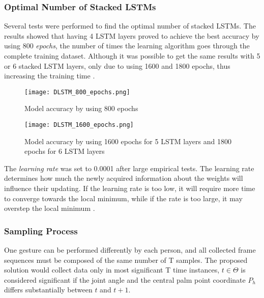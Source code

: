 \subsubsection{Optimal Number of Stacked LSTMs}
\label{sec:dlstm_params}

Several tests were performed to find the optimal number of stacked LSTMs. The results showed that having 4 LSTM layers proved to achieve the best accuracy by using 800 \textit{epochs}, the number of times the learning algorithm goes through the complete training dataset. Although it was possible to get the same results with 5 or 6 stacked LSTM layers, only due to using 1600 and 1800 epochs, thus increasing the training time \cite{avola}. 

\begin{figure}[ht]
    \centering
    \texttt{[image: DLSTM\_800\_epochs.png]}
    \caption{Model accuracy by using 800 epochs \cite{avola}}
    \label{fig:DLSTM_800_epochs}
\end{figure}

\begin{figure}[ht]
    \centering
    \texttt{[image: DLSTM\_1600\_epochs.png]}
    \caption{Model accuracy by using 1600 epochs for 5 LSTM layers and 1800 epochs for 6 LSTM layers \cite{avola}}
    \label{fig:DLSTM_1600_epochs}
\end{figure}

The \textit{learning rate} was set to 0.0001 after large empirical tests. The learning rate determines how much the newly acquired information about the weights will influence their updating. If the learning rate is too low, it will require more time to converge towards the local minimum, while if the rate is too large, it may overstep the local minimum \cite{avola}.

\subsubsection{Sampling Process}

One gesture can be performed differently by each person, and all collected frame sequences must be composed of the same number of T samples. The proposed solution would collect data only in most significant T time instances, $t \in \Theta$ is considered significant if the joint angle and the central palm point coordinate $P_h$ differs substantially between $t$ and $t+1$.

